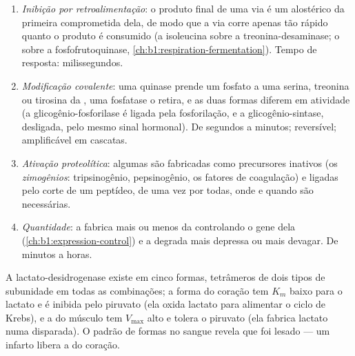 \begin{proposition}\label{prop:b1:enzymes:control}
\begin{enumerate}
  \item \emph{Inibição por retroalimentação}:
        o produto final de uma via é um  alostérico da primeira
         comprometida dela, de modo que a via corre apenas tão
        rápido quanto o produto é consumido (a isoleucina sobre a
        treonina-desaminase; o  sobre a fosfofrutoquinase,
        \cref{ch:b1:respiration-fermentation}). Tempo de resposta:
        milissegundos.
  \item \emph{Modificação covalente}: uma
        quinase prende um fosfato a uma serina, treonina ou tirosina da
        , uma fosfatase o retira, e as duas formas diferem em
        atividade (a glicogênio-fosforilase é ligada pela fosforilação,
        e a glicogênio-sintase, desligada, pelo mesmo sinal hormonal).
        De segundos a minutos; reversível; amplificável em cascatas.
  \item \emph{Ativação proteolítica}: algumas  são fabricadas
        como precursores inativos (os \emph{zimogênios}: tripsinogênio,
        pepsinogênio, os fatores de coagulação) e ligadas pelo corte de
        um peptídeo, de uma vez por todas, onde e quando são
        necessárias.
  \item \emph{Quantidade}: a  fabrica mais ou menos da 
        controlando o gene dela (\cref{ch:b1:expression-control}) e a
        degrada mais depressa ou mais devagar. De minutos a horas.
\end{enumerate}
\end{proposition}

\begin{example}[Isoenzimas]\label{ex:b1:enzymes:isoenzymes}
A lactato-desidrogenase existe em cinco formas, tetrâmeros de dois tipos
de subunidade em todas as combinações; a forma do coração tem $K_m$
baixo para o lactato e é inibida pelo piruvato (ela oxida lactato para
alimentar o ciclo de Krebs), e a do músculo tem $V_{\max}$ alto e tolera
o piruvato (ela fabrica lactato numa disparada). O padrão de formas no
sangue revela que  foi lesado --- um infarto libera a do coração.
\end{example}

